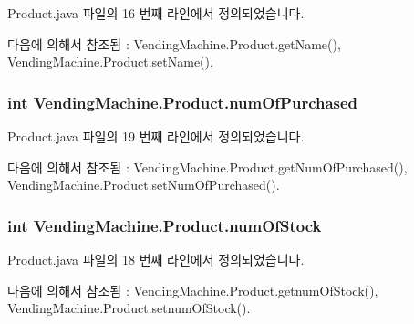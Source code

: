 Product.\+java 파일의 16 번째 라인에서 정의되었습니다.



다음에 의해서 참조됨 \+:  Vending\+Machine.\+Product.\+get\+Name(), Vending\+Machine.\+Product.\+set\+Name().

\subsubsection[{\texorpdfstring{num\+Of\+Purchased}{numOfPurchased}}]{\setlength{\rightskip}{0pt plus 5cm}int Vending\+Machine.\+Product.\+num\+Of\+Purchased\hspace{0.3cm}{\ttfamily [private]}}\hypertarget{class_vending_machine_1_1_product_a7aed5b6b474729af5d417af9f7d8115e}{}\label{class_vending_machine_1_1_product_a7aed5b6b474729af5d417af9f7d8115e}


Product.\+java 파일의 19 번째 라인에서 정의되었습니다.



다음에 의해서 참조됨 \+:  Vending\+Machine.\+Product.\+get\+Num\+Of\+Purchased(), Vending\+Machine.\+Product.\+set\+Num\+Of\+Purchased().

\subsubsection[{\texorpdfstring{num\+Of\+Stock}{numOfStock}}]{\setlength{\rightskip}{0pt plus 5cm}int Vending\+Machine.\+Product.\+num\+Of\+Stock\hspace{0.3cm}{\ttfamily [private]}}\hypertarget{class_vending_machine_1_1_product_ab5412dead0747c2da7e8e686c2e7bd15}{}\label{class_vending_machine_1_1_product_ab5412dead0747c2da7e8e686c2e7bd15}


Product.\+java 파일의 18 번째 라인에서 정의되었습니다.



다음에 의해서 참조됨 \+:  Vending\+Machine.\+Product.\+getnum\+Of\+Stock(), Vending\+Machine.\+Product.\+setnum\+Of\+Stock().

